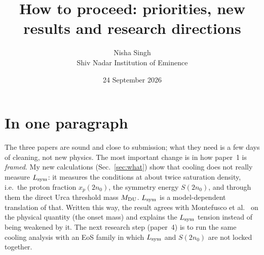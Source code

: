 \documentclass[11pt,a4paper]{article}
\title{How to proceed: priorities, new results and research directions}
\author{Nisha Singh\\ Shiv Nadar Institution of Eminence}
\date{24 September 2026}
\newcommand{\Lsym}{L_{\rm sym}}
\begin{document}
\sloppy
\maketitle

\section*{In one paragraph}
The three papers are sound and close to submission; what they need is a few days of cleaning, not new physics. The most important change is in how paper~1 is \emph{framed}. My new calculations (Sec.~\ref{sec:what}) show that cooling does not really measure $\Lsym$: it measures the conditions at about twice saturation density, i.e.\ the proton fraction $x_p(2n_0)$, the symmetry energy $S(2n_0)$, and through them the direct Urca threshold mass $M_{\rm DU}$. $\Lsym$ is a model-dependent translation of that. Written this way, the result agrees with Montefusco et al.\ \cite{Montefusco2026} on the physical quantity (the onset mass) and explains the $\Lsym$ tension instead of being weakened by it. The next research step (paper~4) is to run the same cooling analysis with an EoS family in which $\Lsym$ and $S(2n_0)$ are not locked together.

\end{document}
